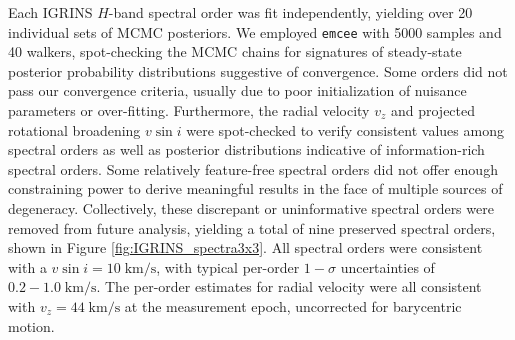\documentclass[trackchanges]{aastex631}
\begin{document}
Each IGRINS $H$-band spectral order was fit independently, yielding over 20 individual sets of MCMC posteriors.  We employed \texttt{emcee} \citep{foreman13} with 5000 samples and 40 walkers, spot-checking the MCMC chains for signatures of steady-state posterior probability distributions suggestive of convergence.  Some orders did not pass our convergence criteria, usually due to poor initialization of nuisance parameters or over-fitting.  Furthermore, the radial velocity $v_z$ and projected rotational broadening $v\sin{i}$ were spot-checked to verify consistent values among spectral orders as well as posterior distributions indicative of information-rich spectral orders.  Some relatively feature-free spectral orders did not offer enough constraining power to derive meaningful results in the face of multiple sources of degeneracy.  Collectively, these discrepant or uninformative spectral orders were removed from future analysis, yielding a total of nine preserved spectral orders, shown in Figure \ref{fig:IGRINS_spectra3x3}. All spectral orders were consistent with a $v\sin{i}=10 \;\mathrm{km/s}$, with typical per-order $1-\sigma$ uncertainties of $0.2-1.0 \;\mathrm{km/s}$.  The per-order estimates for radial velocity were all consistent with $v_z=44\;\mathrm{km/s}$ at the measurement epoch, uncorrected for barycentric motion.
\end{document}
